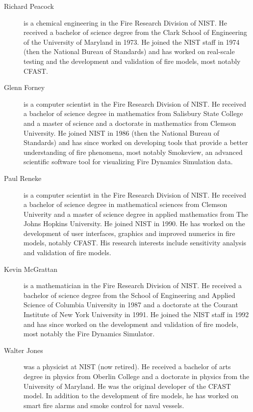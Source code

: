 \begin{description}

\item[Richard Peacock] is a chemical engineering in the Fire Research Division of NIST. He received a bachelor of science degree from the Clark School of Engineering of the University of Maryland in 1973. He joined the NIST staff in 1974 (then the National Bureau of Standards) and has worked on real-scale testing and the development and validation of fire models, most notably CFAST.

\item[Glenn Forney] is a computer scientist in the Fire Research Division of NIST.  He received a bachelor of science degree in mathematics from Salisbury State College and a master of science and a doctorate in mathematics from Clemson University.  He joined NIST in 1986 (then the National Bureau of Standards) and has since worked on developing tools that provide a better understanding of fire phenomena, most notably Smokeview, an advanced scientific software tool for visualizing Fire Dynamics Simulation data.

\item[Paul Reneke] is a computer scientist in the Fire Research Division of NIST.  He received a bachelor of science degree in mathematical sciences from Clemson Univerity and a master of science degree in applied mathematics from The Johns Hopkins University. He joined NIST in 1990. He has worked on the development of user interfaces, graphics and improved numerics in fire models, notably CFAST. His research interests include sensitivity analysis and validation of fire models.

\item[Kevin McGrattan] is a mathematician in the Fire Research Division of NIST. He received a bachelor of science degree from the School of Engineering and Applied Science of Columbia University in 1987 and a doctorate at the Courant Institute of New York University in 1991. He joined the NIST staff in 1992 and has since worked on the development and validation of fire models, most notably the Fire Dynamics Simulator.

\item[Walter Jones] was a physicist at NIST (now retired). He received a bachelor of arts degree in physics from Oberlin College and a doctorate in physics from the University of Maryland. He was the original developer of the CFAST model. In addition to the development of fire models, he has worked on smart fire alarms and smoke control for naval vessels.

\end{description}


